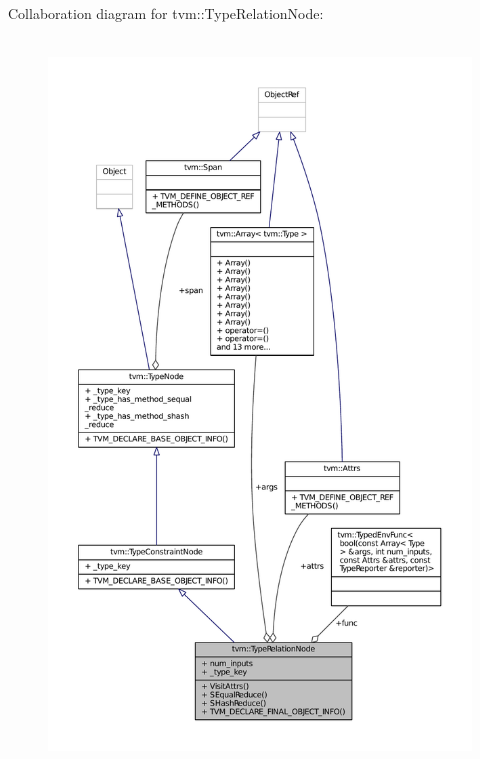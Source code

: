 Collaboration diagram for tvm\+:\+:Type\+Relation\+Node\+:
\nopagebreak
\begin{figure}[H]
\begin{center}
\leavevmode
\includegraphics[height=550pt]{classtvm_1_1TypeRelationNode__coll__graph}
\end{center}
\end{figure}
